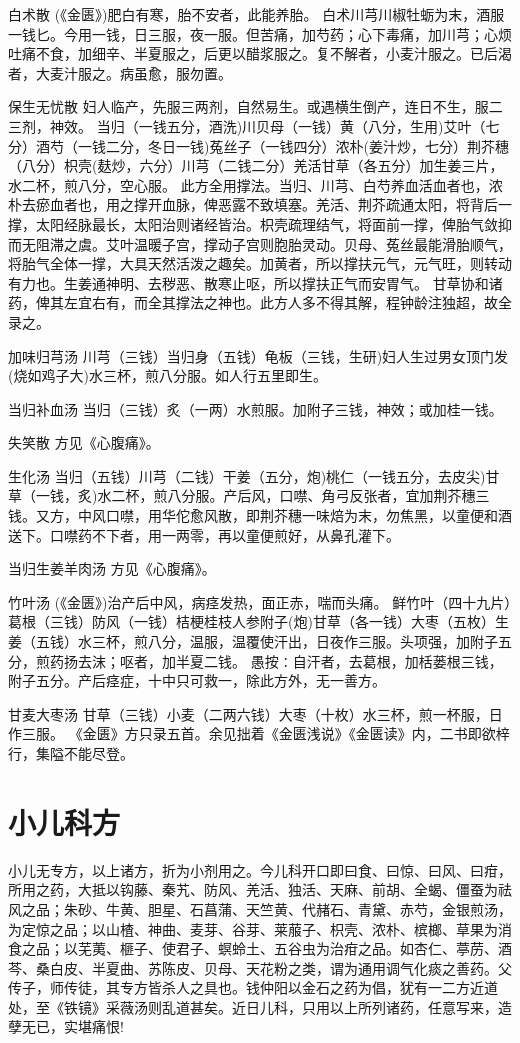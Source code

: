\documentclass[a4paper,12pt,UTF8,twoside]{ctexbook}
\begin{document}
	白术散
	(《金匮》)肥白有寒，胎不安者，此能养胎。
	白术川芎川椒牡蛎为末，酒服一钱匕。今用一钱，日三服，夜一服。但苦痛，加芍药；心下毒痛，加川芎；心烦吐痛不食，加细辛、半夏服之，后更以醋浆服之。复不解者，小麦汁服之。已后渴者，大麦汁服之。病虽愈，服勿置。
	
	保生无忧散
	妇人临产，先服三两剂，自然易生。或遇横生倒产，连日不生，服二三剂，神效。
	当归（一钱五分，酒洗)川贝母（一钱）黄（八分，生用)艾叶（七分）酒芍（一钱二分，冬日一钱)菟丝子（一钱四分）浓朴(姜汁炒，七分）荆芥穗（八分）枳壳(麸炒，六分）川芎（二钱二分）羌活甘草（各五分）加生姜三片，水二杯，煎八分，空心服。
	此方全用撑法。当归、川芎、白芍养血活血者也，浓朴去瘀血者也，用之撑开血脉，俾恶露不致填塞。羌活、荆芥疏通太阳，将背后一撑，太阳经脉最长，太阳治则诸经皆治。枳壳疏理结气，将面前一撑，俾胎气敛抑而无阻滞之虞。艾叶温暖子宫，撑动子宫则胞胎灵动。贝母、菟丝最能滑胎顺气，将胎气全体一撑，大具天然活泼之趣矣。加黄者，所以撑扶元气，元气旺，则转动有力也。生姜通神明、去秽恶、散寒止呕，所以撑扶正气而安胃气。
	甘草协和诸药，俾其左宜右有，而全其撑法之神也。此方人多不得其解，程钟龄注独超，故全录之。
	
	加味归芎汤
	川芎（三钱）当归身（五钱）龟板（三钱，生研)妇人生过男女顶门发(烧如鸡子大)水三杯，煎八分服。如人行五里即生。
	
	当归补血汤
	当归（三钱）炙（一两）水煎服。加附子三钱，神效；或加桂一钱。
	
	失笑散
	方见《心腹痛》。
	
	生化汤
	当归（五钱）川芎（二钱）干姜（五分，炮)桃仁（一钱五分，去皮尖)甘草（一钱，炙)水二杯，煎八分服。产后风，口噤、角弓反张者，宜加荆芥穗三钱。又方，中风口噤，用华佗愈风散，即荆芥穗一味焙为末，勿焦黑，以童便和酒送下。口噤药不下者，用一两零，再以童便煎好，从鼻孔灌下。
	
	当归生姜羊肉汤
	方见《心腹痛》。
	
	竹叶汤
	(《金匮》)治产后中风，病痉发热，面正赤，喘而头痛。
	鲜竹叶（四十九片）葛根（三钱）防风（一钱）桔梗桂枝人参附子(炮)甘草（各一钱）大枣（五枚）生姜（五钱）水三杯，煎八分，温服，温覆使汗出，日夜作三服。头项强，加附子五分，煎药扬去沫；呕者，加半夏二钱。
	愚按∶自汗者，去葛根，加栝蒌根三钱，附子五分。产后痉症，十中只可救一，除此方外，无一善方。
	
	甘麦大枣汤
	甘草（三钱）小麦（二两六钱）大枣（十枚）水三杯，煎一杯服，日作三服。
	《金匮》方只录五首。余见拙着《金匮浅说》《金匮读》内，二书即欲梓行，集隘不能尽登。
	
	\chapter{小儿科方}
	    小儿无专方，以上诸方，折为小剂用之。今儿科开口即曰食、曰惊、曰风、曰疳，所用之药，大抵以钩藤、秦艽、防风、羌活、独活、天麻、前胡、全蝎、僵蚕为祛风之品；朱砂、牛黄、胆星、石菖蒲、天竺黄、代赭石、青黛、赤芍，金银煎汤，为定惊之品；以山楂、神曲、麦芽、谷芽、莱菔子、枳壳、浓朴、槟榔、草果为消食之品；以芜荑、榧子、使君子、螟蛉土、五谷虫为治疳之品。如杏仁、葶苈、酒芩、桑白皮、半夏曲、苏陈皮、贝母、天花粉之类，谓为通用调气化痰之善药。父传子，师传徒，其专方皆杀人之具也。钱仲阳以金石之药为倡，犹有一二方近道处，至《铁镜》采薇汤则乱道甚矣。近日儿科，只用以上所列诸药，任意写来，造孽无已，实堪痛恨!
	
\end{document}
